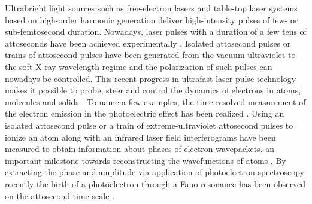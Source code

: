 Ultrabright light sources such as free-electron lasers \cite{seddon2017} and table-top laser systems based on high-order harmonic generation \cite{popmintchev2010,chini2014} deliver high-intensity pulses of few- or sub-femtosecond duration. Nowadays, laser pulses with a duration of a few tens of attoseconds have been achieved experimentally \cite{zhao2012,chen2014}. Isolated attosecond pulses or trains of attosecond pulses have been generated from the vacuum ultraviolet to the soft X-ray wavelength regime and the polarization of such pulses can nowadays be controlled. This recent progress in ultrafast laser pulse technology makes it possible to probe, steer and control the dynamics of electrons in atoms, molecules and solids \cite{vrakking2014,pazourek2015,calegari2016,xu2016,ramasesha2016,peng2019}.
To name a few examples, the time-resolved measurement of the electron emission in the photoelectric effect has been realized \cite{cavalieri2007,schultze2010,klunder2011, tao2016,isinger2017}. Using an isolated attosecond pulse or a train of extreme-ultraviolet attosecond pulses to ionize an atom along with an infrared laser field interferograms have been measured to obtain information about phases of electron wavepackets, an important milestone towards reconstructing the wavefunctions of atoms \cite{remetter2006,Mauritsson2010}. By extracting the phase and amplitude via application of photoelectron spectroscopy recently the birth of a photoelectron through a Fano resonance has been observed on the attosecond time scale \cite{gruson2016}.

